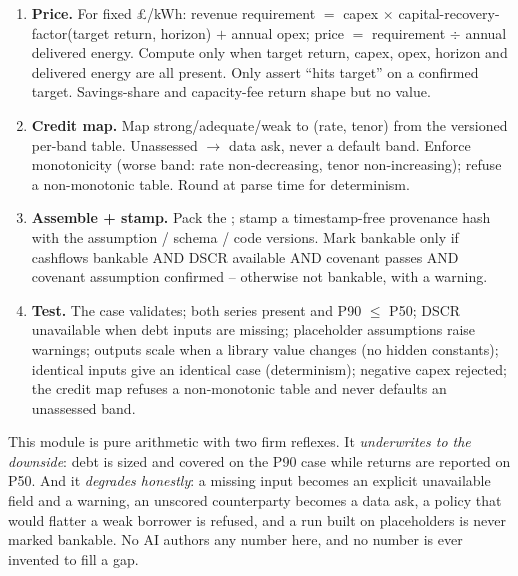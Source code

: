 \begin{rebuild}
\begin{enumerate}
  \item \textbf{Price.} For fixed \pounds/kWh: revenue requirement $=$ capex $\times$ capital-recovery-factor(target return, horizon) $+$ annual opex; price $=$ requirement $\div$ annual delivered energy. Compute only when target return, capex, opex, horizon and delivered energy are all present. Only assert ``hits target'' on a confirmed target. Savings-share and capacity-fee return shape but no value.
  \item \textbf{Credit map.} Map strong/adequate/weak to (rate, tenor) from the versioned per-band table. Unassessed $\rightarrow$ data ask, never a default band. Enforce monotonicity (worse band: rate non-decreasing, tenor non-increasing); refuse a non-monotonic table. Round at parse time for determinism.
  \item \textbf{Assemble + stamp.} Pack the ; stamp a timestamp-free provenance hash with the assumption / schema / code versions. Mark bankable only if cashflows bankable AND DSCR available AND covenant passes AND covenant assumption confirmed -- otherwise not bankable, with a warning.
  \item \textbf{Test.} The case validates; both series present and P90 $\le$ P50; DSCR unavailable when debt inputs are missing; placeholder assumptions raise warnings; outputs scale when a library value changes (no hidden constants); identical inputs give an identical case (determinism); negative capex rejected; the credit map refuses a non-monotonic table and never defaults an unassessed band.
\end{enumerate}
\end{rebuild}

\begin{keyidea}
This module is pure arithmetic with two firm reflexes. It \emph{underwrites to the downside}: debt is sized and covered on the P90 case while returns are reported on P50. And it \emph{degrades honestly}: a missing input becomes an explicit unavailable field and a warning, an unscored counterparty becomes a data ask, a policy that would flatter a weak borrower is refused, and a run built on placeholders is never marked bankable. No AI authors any number here, and no number is ever invented to fill a gap.
\end{keyidea}

